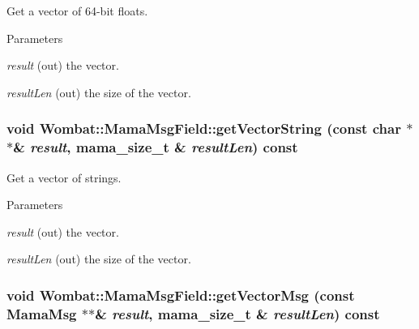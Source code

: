 Get a vector of 64-\/bit floats. 
\begin{DoxyParams}{Parameters}
\item[{\em result}](out) the vector. \item[{\em resultLen}](out) the size of the vector. \end{DoxyParams}
\hypertarget{classWombat_1_1MamaMsgField_a16e8896fee1439cd53346037759780a8}{
\subsubsection[{getVectorString}]{\setlength{\rightskip}{0pt plus 5cm}void Wombat::MamaMsgField::getVectorString (const char $\ast$$\ast$\& {\em result}, \/  {\bf mama\_\-size\_\-t} \& {\em resultLen}) const}}
\label{classWombat_1_1MamaMsgField_a16e8896fee1439cd53346037759780a8}


Get a vector of strings. 
\begin{DoxyParams}{Parameters}
\item[{\em result}](out) the vector. \item[{\em resultLen}](out) the size of the vector. \end{DoxyParams}
\hypertarget{classWombat_1_1MamaMsgField_a41a7c1a93ddc8931aebb277a31bf4dfc}{
\subsubsection[{getVectorMsg}]{\setlength{\rightskip}{0pt plus 5cm}void Wombat::MamaMsgField::getVectorMsg (const {\bf MamaMsg} $\ast$$\ast$\& {\em result}, \/  {\bf mama\_\-size\_\-t} \& {\em resultLen}) const}}
\label{classWombat_1_1MamaMsgField_a41a7c1a93ddc8931aebb277a31bf4dfc}


